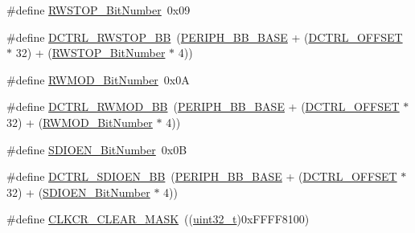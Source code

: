 \begin{DoxyCompactItemize}
\item 
\#define \hyperlink{group___s_d_i_o___private___types_definitions_gae8c0654ad5cba23281bcfa77ef19b9cf}{R\+W\+S\+T\+O\+P\+\_\+\+Bit\+Number}~0x09
\item 
\#define \hyperlink{group___s_d_i_o___private___types_definitions_ga678da1db835676b0fb1976cf3408e2d1}{D\+C\+T\+R\+L\+\_\+\+R\+W\+S\+T\+O\+P\+\_\+\+BB}~(\hyperlink{openmotestm_2library_2inc_2stm32f10x__map_8h_aed7efc100877000845c236ccdc9e144a}{P\+E\+R\+I\+P\+H\+\_\+\+B\+B\+\_\+\+B\+A\+SE} + (\hyperlink{openmotestm_2library_2src_2stm32f10x__sdio_8c_a948c1382c4cfd3af3e406c4d0cdd4240}{D\+C\+T\+R\+L\+\_\+\+O\+F\+F\+S\+ET} $\ast$ 32) + (\hyperlink{openmotestm_2library_2src_2stm32f10x__sdio_8c_ae8c0654ad5cba23281bcfa77ef19b9cf}{R\+W\+S\+T\+O\+P\+\_\+\+Bit\+Number} $\ast$ 4))
\item 
\#define \hyperlink{group___s_d_i_o___private___types_definitions_gad7b722671f65e79d1be2899b643278ad}{R\+W\+M\+O\+D\+\_\+\+Bit\+Number}~0x0A
\item 
\#define \hyperlink{group___s_d_i_o___private___types_definitions_gad34bfe8650534ce24320ae83886c91e3}{D\+C\+T\+R\+L\+\_\+\+R\+W\+M\+O\+D\+\_\+\+BB}~(\hyperlink{openmotestm_2library_2inc_2stm32f10x__map_8h_aed7efc100877000845c236ccdc9e144a}{P\+E\+R\+I\+P\+H\+\_\+\+B\+B\+\_\+\+B\+A\+SE} + (\hyperlink{openmotestm_2library_2src_2stm32f10x__sdio_8c_a948c1382c4cfd3af3e406c4d0cdd4240}{D\+C\+T\+R\+L\+\_\+\+O\+F\+F\+S\+ET} $\ast$ 32) + (\hyperlink{openmotestm_2library_2src_2stm32f10x__sdio_8c_ad7b722671f65e79d1be2899b643278ad}{R\+W\+M\+O\+D\+\_\+\+Bit\+Number} $\ast$ 4))
\item 
\#define \hyperlink{group___s_d_i_o___private___types_definitions_ga37f3e1612e0dae8160be978ebfa54301}{S\+D\+I\+O\+E\+N\+\_\+\+Bit\+Number}~0x0B
\item 
\#define \hyperlink{group___s_d_i_o___private___types_definitions_ga894f7da62b89ddd9f4b79d066056a3c7}{D\+C\+T\+R\+L\+\_\+\+S\+D\+I\+O\+E\+N\+\_\+\+BB}~(\hyperlink{openmotestm_2library_2inc_2stm32f10x__map_8h_aed7efc100877000845c236ccdc9e144a}{P\+E\+R\+I\+P\+H\+\_\+\+B\+B\+\_\+\+B\+A\+SE} + (\hyperlink{openmotestm_2library_2src_2stm32f10x__sdio_8c_a948c1382c4cfd3af3e406c4d0cdd4240}{D\+C\+T\+R\+L\+\_\+\+O\+F\+F\+S\+ET} $\ast$ 32) + (\hyperlink{openmotestm_2library_2src_2stm32f10x__sdio_8c_a37f3e1612e0dae8160be978ebfa54301}{S\+D\+I\+O\+E\+N\+\_\+\+Bit\+Number} $\ast$ 4))
\item 
\#define \hyperlink{group___s_d_i_o___private___types_definitions_gac8d10dd1e49ca9e8a6954146654e9a01}{C\+L\+K\+C\+R\+\_\+\+C\+L\+E\+A\+R\+\_\+\+M\+A\+SK}~((\hyperlink{_p_e___types_8h_a33594304e786b158f3fb30289278f5af}{uint32\+\_\+t})0x\+F\+F\+F\+F8100)

\end{DoxyCompactItemize}
